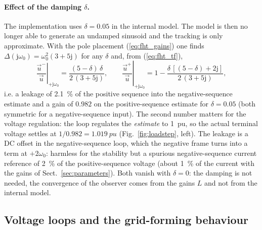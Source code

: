\documentclass[10pt,a4paper]{scrartcl}
\newcommand{\wo}{\omega_0}
\newcommand{\jj}{\mathrm{j}}
\begin{document}
\begin{onehalfspace}
\paragraph{Effect of the damping $\delta$.} The implementation uses $\delta = 0.05$ in the internal model. The model is then no longer able to generate an undamped sinusoid and the tracking is only approximate. With the pole placement (\ref{eq:fht_gains}) one finds $\Delta(\jj\wo) = \wo^2(3 + 5\jj)$ for any $\delta$ and, from (\ref{eq:fht_tf}),
\begin{equation}
\left.\frac{\vec u^-}{\vec u}\right|_{+\jj\wo} = \frac{(5 - \delta)\,\delta}{2\,(3 + 5\jj)}, \qquad
\left.\frac{\vec u^+}{\vec u}\right|_{+\jj\wo} = 1 - \frac{\delta\,[(5 - \delta) + 2\jj]}{2\,(3 + 5\jj)},
\label{eq:fht_leak}
\end{equation}
i.e. a leakage of \SI{2.1}{\percent} of the positive sequence into the negative-sequence estimate and a gain of $0.982$ on the positive-sequence estimate for $\delta = 0.05$ (both symmetric for a negative-sequence input). The second number matters for the voltage regulation: the loop regulates the \emph{estimate} to \SI{1}{pu}, so the actual terminal voltage settles at $1/0.982 = \SI{1.019}{pu}$ (Fig.~\ref{fig:loadstep}, left). The leakage is a DC offset in the negative-sequence loop, which the negative frame turns into a term at $+2\wo$: harmless for the stability but a spurious negative-sequence current reference of \SI{2}{\percent} of the positive-sequence voltage (about \SI{1}{\percent} of the current with the gains of Sect.~\ref{sec:parameters}). Both vanish with $\delta = 0$: the damping is not needed, the convergence of the observer comes from the gains $L$ and not from the internal model.

\subsection{Voltage loops and the grid-forming behaviour}
\label{sec:voltageloops}


\end{onehalfspace}
\end{document}
